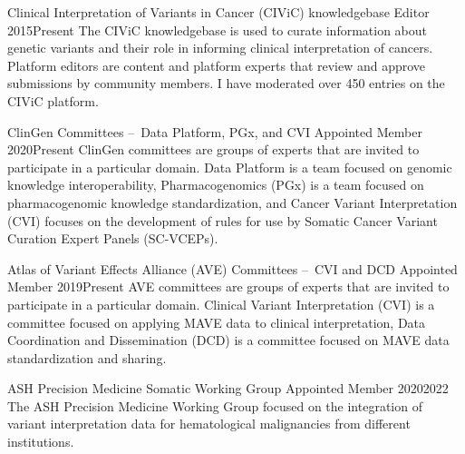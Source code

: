 \documentclass[10pt]{article} %
\begin{document}
 \cmte
{Clinical Interpretation of Variants in Cancer (CIViC) knowledgebase}
{Editor}
{2015}{Present}
{The CIViC knowledgebase is used to curate information about genetic variants and their role in 
informing clinical interpretation of cancers. Platform editors are content and platform experts that 
review and approve submissions by community members. I have moderated over 450 entries on
the CIViC platform.}

 \cmte
{ClinGen Committees – Data Platform, PGx, and CVI}
{Appointed Member}
{2020}{Present}
{ClinGen committees are groups of experts that are invited to participate in a particular domain.
Data Platform is a team focused on genomic knowledge interoperability, Pharmacogenomics (PGx) is
a team focused on pharmacogenomic knowledge standardization, and Cancer Variant Interpretation (CVI)
focuses on the development of rules for use by Somatic Cancer Variant Curation Expert Panels
(SC-VCEPs).}

 \cmte
{Atlas of Variant Effects Alliance (AVE) Committees – CVI and DCD}
{Appointed Member}
{2019}{Present}
{AVE committees are groups of experts that are invited to participate in a particular domain.
Clinical Variant Interpretation (CVI) is a committee focused on applying MAVE data to clinical interpretation,
Data Coordination and Dissemination (DCD) is a committee focused on MAVE data standardization and sharing.}

 \cmte
{ASH Precision Medicine Somatic Working Group}
{Appointed Member}
{2020}{2022}
{The ASH Precision Medicine Working Group focused on the integration of variant interpretation data for
hematological malignancies from different institutions.}



\end{document}

